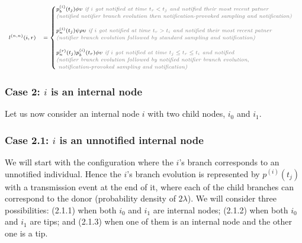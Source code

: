\documentclass[10pt,letterpaper]{article}
\begin{document}
\begin{equation}
\scriptsize
\begin{array}{ll}
l^{(n,n)}(i,r) &= \begin{cases}
p_b^{(i)}(t_j)\phi\upsilon \textit{\color{gray} ~if $i$ got notified at time $t_r < t_j$ and notified their most recent patner}\\
\textit{\color{gray} (notified notifier branch evolution then notification-provoked sampling and  notification)}\\
\\
p_n^{(i)}(t_j)\psi\rho\upsilon \textit{\color{gray} ~if $i$ got notified at time $t_r > t_i$ and notified their most recent patner}\\
\textit{\color{gray} (notifier branch evolution followed by standard sampling and  notification)}\\
\\
p_n^{(r)}(t_j) p_b^{(i)}(t_r) \phi \upsilon \textit{\color{gray} ~if $i$ got notified at time $t_j \leq t_r \leq t_i$ and notified}\\
\textit{\color{gray} (notifier branch evolution followed by notified notifier branch evolution,} \\
\textit{\color{gray}~notification-provoked sampling and notification)}\\
\end{cases}\\
\end{array}
\label{eq:tip}
\end{equation}

\subsubsection*{Case 2: $i$ is an internal node} 
Let us now consider an internal node $i$ with two child nodes, $i_0$ and $i_1$. 

\subsubsection*{Case 2.1: $i$ is an unnotified internal node} 
We will start with the configuration where the $i$'s branch corresponds to an unnotified individual. Hence the $i$'s branch evolution is represented by $p^{(i)}(t_j)$ with a transmission event at the end of it, where each of the child branches can correspond to the donor (probability density of $2\lambda$). We will consider three possibilities: (2.1.1) when both $i_0$ and $i_1$ are internal nodes; (2.1.2) when both $i_0$ and $i_1$ are tips; and (2.1.3) when one of them is an internal node and the other one is a tip.
\end{document}
